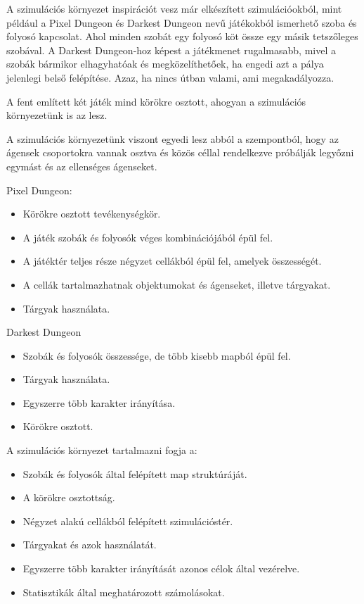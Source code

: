 

A szimulációs környezet inspirációt vesz már elkészített szimulációokból, mint például a Pixel Dungeon és Darkest Dungeon
nevű játékokból ismerhető szoba és folyosó kapcsolat. Ahol minden szobát egy folyosó köt össze egy másik tetszőleges szobával.
A Darkest Dungeon-hoz képest a játékmenet rugalmasabb, mivel a szobák bármikor elhagyhatóak és megközelíthetőek, ha engedi azt a pálya jelenlegi belső felépítése.
Azaz, ha nincs útban valami, ami megakadályozza.

A fent említett két játék mind körökre osztott, ahogyan a szimulációs környezetünk is az lesz.

A szimulációs környezetünk viszont egyedi lesz abból a szempontból, hogy az ágensek csoportokra vannak osztva és közös céllal
rendelkezve próbálják legyőzni egymást és az ellenséges ágenseket.


\noindent Pixel Dungeon:

\begin{itemize}
    \item Körökre osztott tevékenységkör.
    \item A játék szobák és folyosók véges kombinációjából épül fel.
    \item A játéktér teljes része négyzet cellákból épül fel, amelyek összességét.
    \item A cellák tartalmazhatnak objektumokat és ágenseket, illetve tárgyakat.
    \item Tárgyak használata.
\end{itemize}

\noindent Darkest Dungeon

\begin{itemize}
    \item Szobák és folyosók összessége, de több kisebb mapból épül fel.
    \item Tárgyak használata.
    \item Egyszerre több karakter irányítása.
    \item Körökre osztott.
\end{itemize}

\noindent A szimulációs környezet tartalmazni fogja a:

\begin{itemize}
    \item Szobák és folyosók által felépített map struktúráját.
    \item A körökre osztottság.
    \item Négyzet alakú cellákból felépített szimulációstér.
    \item Tárgyakat és azok használatát.
    \item Egyszerre több karakter irányítását azonos célok által vezérelve.
    \item Statisztikák által meghatározott számolásokat.
\end{itemize}

